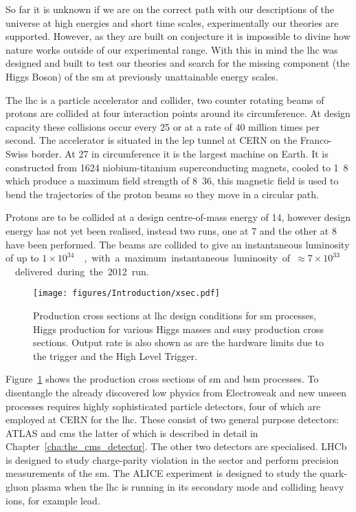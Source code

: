 So far it is unknown if we are on the correct path with our descriptions of 
the universe at high energies and short time scales, experimentally our 
theories are supported. However, as they are built on conjecture it is impossible to divine how nature works outside of our experimental range.
With this in mind the \ac{lhc} was designed and built to test our theories and 
search for the missing component (the Higgs Boson) of the \ac{sm} at previously 
unattainable energy scales.

The \ac{lhc} is a particle accelerator and collider, two counter 
rotating beams of protons are collided at four interaction points around its 
circumference. At design capacity these collisions occur every 
\unit{25}{\nano\second} or at a rate of 40 million times per second.
The accelerator is situated in the \ac{lep} tunnel at CERN on the 
Franco-Swiss border. At \unit{27}{\kilo\meter} in circumference it is the 
largest machine on Earth. It is constructed from 1624 niobium-titanium 
superconducting magnets, cooled to \unit{1.8}{\kelvin} which produce a maximum 
field strength of \unit{8.36}{\tesla}, this magnetic field is used to bend the 
trajectories of the proton beams so they move in a circular path.

Protons are to be collided at a design centre-of-mass energy of 
\unit{14}{\TeV}, however design energy has not yet been realised, instead two 
runs, one at \unit{7}{\TeV} and the other at \unit{8}{\TeV} have been 
performed. The beams are collided to give an instantaneous luminosity of up to 
\unit{$1\times10^{34}$}{\lumiunits}, with a maximum instantaneous luminosity of 
\unit{$\approx 7 \times 10^{33}$}{\lumiunits} delivered during the 2012 run.



\begin{figure}[ht]
  \centering
    \texttt{[image: figures/Introduction/xsec.pdf]}
  \caption{Production cross sections at \ac{lhc} design conditions for \ac{sm} processes, Higgs production for various Higgs masses and \ac{susy} production cross sections. Output rate is also shown as are the hardware limits due to the \Lone trigger and the High Level Trigger. }
  \label{fig:figures_Introduction_xsec}
\end{figure}

Figure~\ref{fig:figures_Introduction_xsec} shows the production cross sections 
of \ac{sm} and \ac{bsm} processes. To disentangle the already discovered 
low \pt physics from Electroweak and new unseen processes requires 
highly sophisticated particle detectors, four of which are employed at CERN for 
the \ac{lhc}. These consist of two general purpose detectors: 
ATLAS and \ac{cms} the latter of which is 
described in detail in Chapter~\ref{cha:the_cms_detector}. The other two 
detectors are specialised. LHCb is designed to study 
charge-parity violation in the \Pbottom sector and perform precision 
measurements of the \ac{sm}. The ALICE experiment is designed to 
study the quark-gluon plasma when the \ac{lhc} is running in its secondary 
mode and colliding heavy ions, for example lead.


